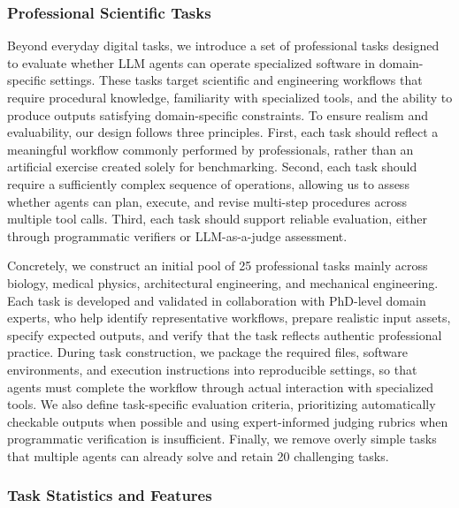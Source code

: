 \documentclass{llmxive}
\begin{document}
\subsubsection{Professional Scientific Tasks}\label{sec:pro-tasks}
Beyond everyday digital tasks, we introduce a set of professional tasks designed to evaluate whether LLM agents can operate specialized software in domain-specific settings. These tasks target scientific and engineering workflows that require procedural knowledge, familiarity with specialized tools, and the ability to produce outputs satisfying domain-specific constraints. To ensure realism and evaluability, our design follows three principles. First, each task should reflect a meaningful workflow commonly performed by professionals, rather than an artificial exercise created solely for benchmarking. Second, each task should require a sufficiently complex sequence of operations, allowing us to assess whether agents can plan, execute, and revise multi-step procedures across multiple tool calls. Third, each task should support reliable evaluation, either through programmatic verifiers or LLM-as-a-judge assessment.

Concretely, we construct an initial pool of 25 professional tasks mainly across biology, medical physics, architectural engineering, and mechanical engineering. Each task is developed and validated in collaboration with PhD-level domain experts, who help identify representative workflows, prepare realistic input assets, specify expected outputs, and verify that the task reflects authentic professional practice. During task construction, we package the required files, software environments, and execution instructions into reproducible settings, so that agents must complete the workflow through actual interaction with specialized tools. We also define task-specific evaluation criteria, prioritizing automatically checkable outputs when possible and using expert-informed judging rubrics when programmatic verification is insufficient. Finally, we remove overly simple tasks that multiple agents can already solve and retain 20 challenging tasks.

\subsubsection{Task Statistics and Features}
\end{document}
